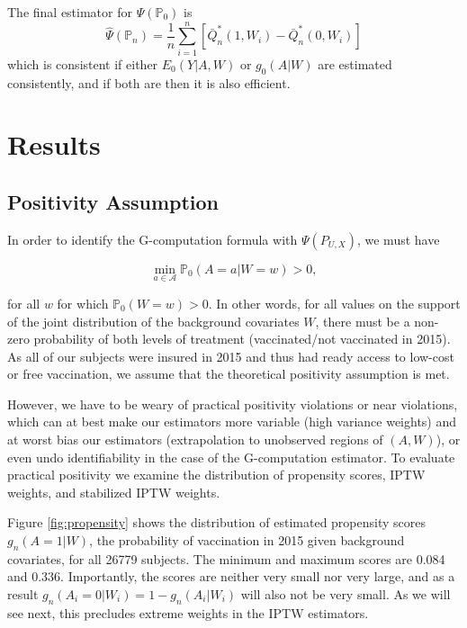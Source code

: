 \documentclass[english, 12pt]{article}
\def\P{\mathbb{P}}
\begin{document}
The final estimator for $\Psi(\P_0)$ is
$$\hat{\Psi}(\P_n) = \frac{1}{n}\sum_{i = 1}^n [\bar{Q}^*_n(1, W_i) - \bar{Q}^*_n(0, W_i)]$$
which is consistent if either $E_0(Y | A, W)$ or $g_0(A|W)$ are estimated consistently, and if both are then it is also efficient.

\section{Results}

\subsection{Positivity Assumption}

In order to identify the G-computation formula with $\Psi(P_{U,X})$, we must have

$$ \min_{a \in \mathcal{A}} \P_0(A = a| W = w) > 0,$$

for all $w$ for which $\P_0(W = w) > 0$. In other words, for all values on the support of the joint distribution of the background covariates $W$, there must be a non-zero probability of both levels of treatment (vaccinated/not vaccinated in 2015). As all of our subjects were insured in 2015 and thus had ready access to low-cost or free vaccination, we assume that the theoretical positivity assumption is met.

However, we have to be weary of practical positivity violations or near violations, which can at best make our estimators more variable (high variance weights) and at worst bias our estimators (extrapolation to unobserved regions of $(A, W)$), or even undo identifiability in the case of the G-computation estimator. To evaluate practical positivity we examine the distribution of propensity scores, IPTW weights, and stabilized IPTW weights.

Figure \ref{fig:propensity} shows the distribution of estimated propensity scores $g_n(A = 1 | W)$, the probability of vaccination in 2015 given background covariates, for all 26779 subjects. The minimum and maximum scores are 0.084 and 0.336. Importantly, the scores are neither very small nor very large, and as a result $g_n(A_i = 0|W_i) = 1 - g_n(A_i|W_i)$ will also not be very small. As we will see next, this precludes extreme weights in the IPTW estimators.
\end{document}
